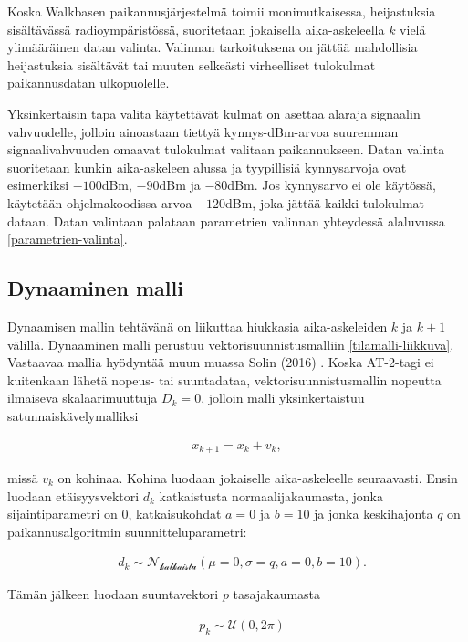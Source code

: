 \documentclass[
  12pt,
  a4paper, twoside]{book}
\begin{document}
Koska Walkbasen paikannusjärjestelmä toimii monimutkaisessa, heijastuksia sisältävässä radioympäristössä, suoritetaan jokaisella aika-askeleella \(k\) vielä ylimääräinen datan valinta. Valinnan tarkoituksena on jättää mahdollisia heijastuksia sisältävät tai muuten selkeästi virheelliset tulokulmat paikannusdatan ulkopuolelle.

Yksinkertaisin tapa valita käytettävät kulmat on asettaa alaraja signaalin vahvuudelle, jolloin ainoastaan tiettyä kynnys-dBm-arvoa suuremman signaalivahvuuden omaavat tulokulmat valitaan paikannukseen. Datan valinta suoritetaan kunkin aika-askeleen alussa ja tyypillisiä kynnysarvoja ovat esimerkiksi \(-100\)dBm, \(-90\)dBm ja \(-80\)dBm. Jos kynnysarvo ei ole käytössä, käytetään ohjelmakoodissa arvoa \(-120\)dBm, joka jättää kaikki tulokulmat dataan. Datan valintaan palataan parametrien valinnan yhteydessä alaluvussa \ref{parametrien-valinta}.

\hypertarget{dynaaminen-malli}{%
\subsection{Dynaaminen malli}\label{dynaaminen-malli}}

Dynaamisen mallin tehtävänä on liikuttaa hiukkasia aika-askeleiden \(k\) ja \(k+1\) välillä. Dynaaminen malli perustuu vektorisuunnistusmalliin \ref{tilamalli-liikkuva}. Vastaavaa mallia hyödyntää muun muassa Solin (2016) \citep{Solin-2016}. Koska AT-2-tagi ei kuitenkaan lähetä nopeus- tai suuntadataa, vektorisuunnistusmallin nopeutta ilmaiseva skalaarimuuttuja \(D_k=0\), jolloin malli yksinkertaistuu satunnaiskävelymalliksi

\begin{align}\label{dynaaminen-malli-empiirinen}
x_{k+1}=x_k + v_k,
\end{align}

missä \(v_k\) on kohinaa. Kohina luodaan jokaiselle aika-askeleelle seuraavasti. Ensin luodaan etäisyysvektori \(d_k\) katkaistusta normaalijakaumasta, jonka sijaintiparametri on 0, katkaisukohdat \(a=0\) ja \(b=10\) ja jonka keskihajonta \(q\) on paikannusalgoritmin suunnitteluparametri:

\begin{align}
&d_k \sim \mathcal{N_{\text{katkaistu}}}(\mu=0, \sigma=q, a=0, b=10).
\end{align}

Tämän jälkeen luodaan suuntavektori \(p\) tasajakaumasta

\begin{align}
&p_k\sim\mathcal{U}(0, 2 \pi)
\end{align}
\end{document}
